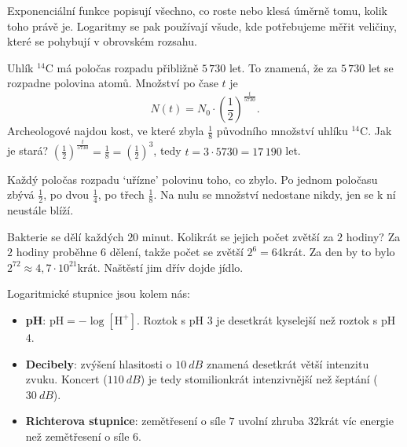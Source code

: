 Exponenciální funkce popisují všechno, co roste nebo klesá úměrně tomu, kolik toho právě je. Logaritmy se pak používají všude, kde potřebujeme měřit veličiny, které se pohybují v obrovském rozsahu.

\begin{example}[ (rozpad)]
  Uhlík $^{14}$C má poločas rozpadu přibližně $5\,730$ let. To znamená, že za $5\,730$ let se rozpadne polovina atomů. Množství po čase $t$ je
  \begin{equation*}
    N(t) = N_0\cdot{\left(\frac{1}{2}\right)}^{\frac{t}{5730}}.
  \end{equation*}
  Archeologové najdou kost, ve které zbyla $\frac{1}{8}$ původního množství uhlíku $^{14}$C. Jak je stará? ${\left(\frac{1}{2}\right)}^{\frac{t}{5730}} = \frac{1}{8} = {\left(\frac{1}{2}\right)}^3$, tedy $t = 3\cdot 5730 = 17\,190$ let.
  \begin{center}
  \end{center}
  Každý poločas rozpadu `uřízne' polovinu toho, co zbylo. Po jednom poločasu zbývá $\frac{1}{2}$, po dvou $\frac{1}{4}$, po třech $\frac{1}{8}$. Na nulu se množství nedostane nikdy, jen se k ní neustále blíží.
\end{example}

\begin{example}[ (růst)]
  Bakterie se dělí každých $20$ minut. Kolikrát se jejich počet zvětší za $2$ hodiny? Za $2$ hodiny proběhne $6$ dělení, takže počet se zvětší $2^6 = 64$krát. Za den by to bylo $2^{72}\approx 4{,}7\cdot 10^{21}$krát. Naštěstí jim dřív dojde jídlo.
\end{example}

\begin{note}
  Logaritmické stupnice jsou kolem nás:
  \begin{itemize}
    \item \textbf{pH}: $\mathrm{pH} = -\log[\mathrm{H}^+]$. Roztok s pH $3$ je desetkrát kyselejší než roztok s pH $4$.
    \item \textbf{Decibely}: zvýšení hlasitosti o $10\ \si{dB}$ znamená desetkrát větší intenzitu zvuku. Koncert ($110\ \si{dB}$) je tedy stomilionkrát intenzivnější než šeptání ($30\ \si{dB}$).
    \item \textbf{Richterova stupnice}: zemětřesení o síle $7$ uvolní zhruba $32$krát víc energie než zemětřesení o síle $6$.
  \end{itemize}
\end{note}

